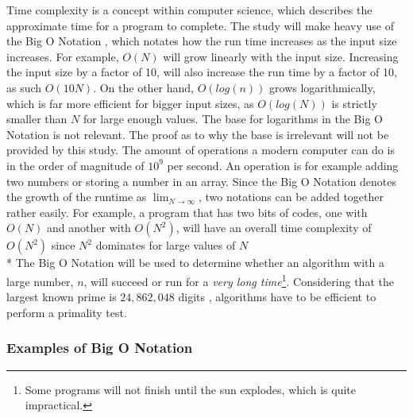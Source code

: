 \documentclass[main.tex]{subfiles}
\begin{document}
Time complexity \cite{theorem:time_comp} is a concept within computer science, which describes the approximate time for a program to complete. The study will make heavy use of the Big O Notation \cite{theorem:big_O}, which notates how the run time increases as the input size increases. For example, $O(N)$ will grow linearly with the input size. Increasing the input size by a factor of 10, will also increase the run time by a factor of 10, as such $O(10N)$. On the other hand, $O(log(n))$ grows logarithmically, which is far more efficient for bigger input sizes, as $O(log(N))$ is strictly smaller than $N$ for large enough values. The base for logarithms in the Big O Notation is not relevant. The proof as to why the base is irrelevant will not be provided by this study.
\newline
The amount of operations a modern computer can do is in the order of magnitude of $10^{9}$ per second. An operation is for example adding two numbers or storing a number in an array. 
\newline
Since the Big O Notation denotes the growth of the runtime as $\lim_{N\to\infty}$, two notations can be added together rather easily. For example, a program that has two bits of codes, one with $O(N)$ and another with $O(N^{2})$, will have an overall time complexity of $O(N^{2})$ since $N^{2}$ dominates for large values of $N$
\newline
\\*
The Big O Notation will be used to determine whether an algorithm with a large number, $n$, will succeed or run for a \textit{very long time}\footnote{Some programs will not finish until the sun explodes, which is quite impractical.}. Considering that the largest known prime is $24,862,048$ digits \cite{prime:largest_digits}, algorithms have to be efficient to perform a primality test. 

\subsubsection{Examples of Big O Notation}
\end{document}
